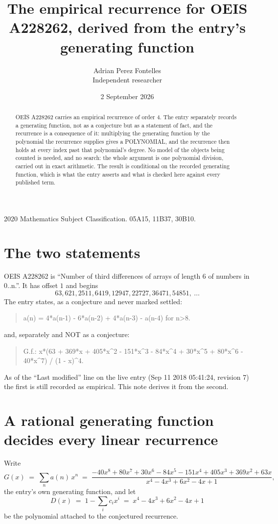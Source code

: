 \documentclass[11pt,a4paper]{article}
\title{The empirical recurrence for OEIS A228262, derived from the entry's generating function}
\author{Adrian Perez Fontelles\\ \small Independent researcher}
\date{2 September 2026}
\theoremstyle{plain}
\theoremstyle{definition}
\begin{document}
\maketitle

\begin{abstract}
OEIS A228262 carries an empirical recurrence of order $4$. The entry separately records a
generating function, not as a conjecture but as a statement of fact, and the recurrence is a
consequence of it: multiplying the generating function by the polynomial the recurrence
supplies gives a POLYNOMIAL, and the recurrence then holds at every index past that
polynomial's degree. No model of the objects being counted is needed, and no search: the
whole argument is one polynomial division, carried out in exact arithmetic. The result is
conditional on the recorded generating function, which is what the entry asserts and what is
checked here against every published term.
\end{abstract}

\noindent\small 2020 Mathematics Subject Classification. 05A15, 11B37, 30B10.\normalsize

\section{The two statements}

OEIS A228262 is ``Number of third differences of arrays of length 6 of numbers in 0..n.''. It has offset $1$ and begins
\[
63, 621, 2511, 6419, 12947, 22727, 36471, 54851,\ \dots
\]
The entry states, as a conjecture and never marked settled:
\begin{quote}
a(n) = 4*a(n-1) - 6*a(n-2) + 4*a(n-3) - a(n-4) for n>8.
\end{quote}
and, separately and NOT as a conjecture:
\begin{quote}
G.f.: x*(63 + 369*x + 405*x\^{}2 - 151*x\^{}3 - 84*x\^{}4 + 30*x\^{}5 + 80*x\^{}6 - 40*x\^{}7) / (1 - x)\^{}4.
\end{quote}
As of the ``Last modified'' line on the live entry (Sep 11 2018 05:41:24, revision 7) the first is still
recorded as empirical. This note derives it from the second.

\section{A rational generating function decides every linear recurrence}

Write
\[
G(x)\;=\;\sum_{n}a(n)\,x^{n}\;=\;\frac{- 40 x^{8} + 80 x^{7} + 30 x^{6} - 84 x^{5} - 151 x^{4} + 405 x^{3} + 369 x^{2} + 63 x}{x^{4} - 4 x^{3} + 6 x^{2} - 4 x + 1},
\]
the entry's own generating function, and let
\[
D(x)\;=\;1-\sum_i c_i x^{i}\;=\;x^{4} - 4 x^{3} + 6 x^{2} - 4 x + 1
\]
be the polynomial attached to the conjectured recurrence.
\end{document}

